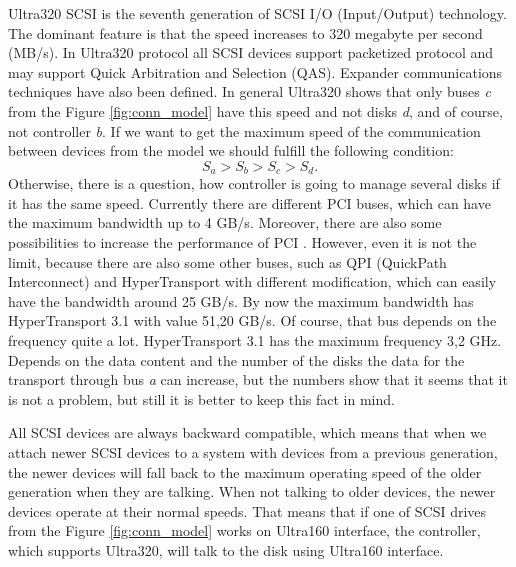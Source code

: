 Ultra320 SCSI \cite{ultra320} is the seventh generation of SCSI I/O (Input/Output) technology. The dominant feature is that the speed increases to 320 megabyte per second (MB/s). In Ultra320 protocol all SCSI devices support packetized protocol and may support Quick Arbitration and Selection (QAS). Expander communications techniques have also been defined. In general Ultra320 shows that only buses \emph{c} from the Figure \ref{fig:conn_model} have this speed and not disks \emph{d}, and of course, not controller \emph{b}. If we want to get the maximum speed of the communication between devices from the model we should fulfill the following condition:
\begin{equation}
	S_a > S_b > S_c > S_d.
\end{equation}
Otherwise, there is a question, how controller is going to manage several disks if it has the same speed.
Currently there are different PCI buses, which can have the maximum bandwidth up to 4 GB/s. Moreover, there are also some possibilities to increase the performance of PCI \cite{increase_pci}. However, even it is not the limit, because there are also some other buses, such as QPI (QuickPath Interconnect) and HyperTransport with different modification, which can easily have the bandwidth around 25 GB/s. By now the maximum bandwidth has HyperTransport 3.1 with value 51,20 GB/s. Of course, that bus depends on the frequency quite a lot. HyperTransport 3.1 has the maximum frequency 3,2 GHz. Depends on the data content and the number of the disks the data for the transport through bus \emph{a} can increase, but the numbers show that it seems that it is not a problem, but still it is better to keep this fact in mind.



All SCSI devices are always backward compatible, which means that when we attach newer SCSI devices to a system with devices from a previous generation, the newer devices will fall back to the maximum operating speed of the older generation when they are talking. When not talking to older devices, the newer devices operate at their normal speeds. That means that if one of SCSI drives from the Figure \ref{fig:conn_model} works on Ultra160 interface, the controller, which supports Ultra320, will talk to the disk using Ultra160 interface.

